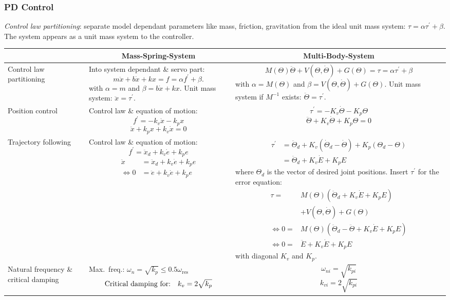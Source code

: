 \subsubsection{PD Control}
\textit{Control law partitioning}: separate model dependant parameters like mass, friction, gravitation from the ideal unit mass system: $\tau=\alpha \tau^{\prime}+\beta$. The system appears as a unit mass system to the controller.
\begin{center}
\begin{tabular}{ |p{3cm}||p{6cm}|p{7cm}| }
 \hline
  & \multicolumn{1}{|c|}{\textbf{Mass-Spring-System}} & \multicolumn{1}{|c|}{\textbf{Multi-Body-System}} \\
 \hline\hline
 Control law partitioning 
 & 
 Into system dependant \& servo part:
 $$m \ddot{x}+b \dot{x}+k x=f=\alpha f^{\prime}+\beta.$$
 with $\alpha=m$ and $\beta=b \dot{x}+k x$.  Unit mass system: $\ddot{x}=\tau^{\prime}$.
 & 
 $$M(\Theta) \ddot{\Theta}+V(\Theta, \dot{\Theta})+G(\Theta)=\tau=\alpha \tau^{\prime}+\beta$$
 with $\alpha=M(\Theta)$ and $\beta=V(\Theta, \dot{\Theta})+G(\Theta)$. Unit mass system if $M^{-1}$ exists: $\ddot{\Theta}=\tau^{\prime}$.
 \\
 \hline
 Position control 
 &
 Control law \& equation of motion:
 $$f^{\prime}=-k_{v} \dot{x}-k_{p} x$$
 $$\ddot{x}+k_{p} x+k_{v} \dot{x}=0$$
 &
 $$\tau^{\prime}=-K_{v} \dot{\Theta}-K_{p} \Theta$$
 $$\ddot{\Theta}+K_{v} \dot{\Theta}+K_{p} \Theta=0$$ 
 \\
 \hline
 Trajectory following 
 &
 Control law \& equation of motion:
 $$f^{\prime}=\ddot{x}_{d}+k_{v} \dot{e}+k_{p} e$$
 $$\begin{aligned}
 \ddot{x}&=\ddot{x}_{d}+k_{v} \dot{e}+k_{p} e\\ \Leftrightarrow 0&=\ddot{e}+k_{v} \dot{e}+k_{p} e
 \end{aligned}$$	
 &
 $$\begin{aligned}
 	\tau^{\prime}&=\ddot{\Theta}_{d}+K_{v}\left(\dot{\Theta}_{d}-\dot{\Theta}\right)+K_{p}\left(\Theta_{d}-\Theta\right)\\&=\ddot{\Theta}_{d}+K_{v}\dot{E}+K_{p}E
 \end{aligned}$$
 where $\Theta_{d}$ is the vector of desired joint positions. Insert $\tau^{\prime}$ for the error equation:
 $$\begin{aligned}
 \tau =&M(\Theta)\left(\ddot{\Theta}_{d}+K_{v} \dot{E}+K_{p} E\right)\\&+V(\Theta, \dot{\Theta})+G(\Theta) \\
 \Leftrightarrow 0 =&M(\Theta)\left(\ddot{\Theta}_{d}-\ddot{\Theta}+K_{v} \dot{E}+K_{p} E\right) \\
 \Leftrightarrow 0 =&\ddot{E}+K_{v} \dot{E}+K_{p} E
 \end{aligned}$$
 with diagonal $K_{v}$ and $K_{p}$.
 
 \\
 \hline
 Natural frequency \& critical damping
 & 
 Max.\ freq.: $\omega_{n} = \sqrt{k_{p}}\leq 0.5\omega_{\text{res}}$
 $$\text{Critical damping for:\quad}k_{v}=2 \sqrt{k_{p}}$$
 & 
 $$\omega_{n i}=\sqrt{k_{p i}}$$
 $$k_{v i}=2 \sqrt{k_{p i}}$$
 \\
 \hline
\end{tabular}
\end{center}

